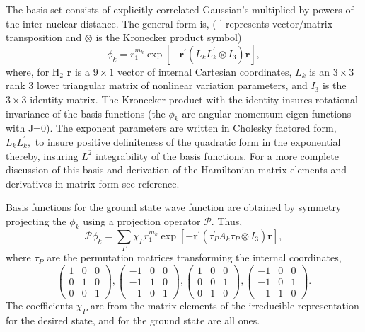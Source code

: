 The basis set consists of explicitly correlated Gaussian's multiplied by
powers of the inter-nuclear distance. 
The general form is, ( $^{\prime }$ represents vector/matrix transposition
and $\otimes $ is the Kronecker product symbol) 
\begin{equation} \label{basis}
 \phi _k =
  r_{1}^{m_k} \exp \left[ -\mathbf{r}^{\prime }
      \left( L_kL_k^{\prime }\otimes I_3\right)\mathbf{r}\right],
\end{equation}
where, for H$_2$ $ \mathbf{r}$ is a $9\times 1$ vector of internal 
Cartesian coordinates, $L_k$ is
an $3\times 3$ rank $3$ lower triangular matrix of nonlinear variation
parameters, and $I_3$ is the $3\times 3$ identity matrix. The Kronecker
product with the identity insures rotational invariance of the basis
functions (the $\phi _k$ are angular momentum eigen-functions with J=0). The
exponent parameters are written in Cholesky factored form, 
$L_kL_k^{\prime },$ 
to insure positive definiteness of the quadratic form in the exponential
thereby, insuring $L^2$ integrability of the basis functions.
For a more complete discussion of
this basis and derivation of the Hamiltonian matrix elements and derivatives
in matrix form see reference\cite{Kinghorn99a}.

Basis functions for the ground state wave function 
are obtained by symmetry
projecting the $\phi _k$ using a  projection operator
$\mathcal{P}$. Thus,
\begin{equation}
{\mathcal{P}} \phi_{k} = \sum_{P} \chi_{P} r_{1}^{m_{k}} 
   \exp \left[-\mathbf{r}^{\prime} \left( \tau_{P}^{\prime} A_{k} \tau_{P}
                                 \otimes I_{3} \right) \mathbf{r} \right],
\end{equation}
where $\tau_{P} $ are the permutation matrices transforming the
internal coordinates, 
\begin{equation}
\left( 
\begin{array}{ccc}
1 & 0 & 0 \\ 
0 & 1 & 0 \\
0 & 0 & 1
\end{array} 
\right),
\left( 
\begin{array}{ccc}
-1 & 0 & 0 \\ 
-1 & 1 & 0 \\
-1 & 0 & 1
\end{array} 
\right),
\left( 
\begin{array}{ccc}
1 & 0 & 0 \\ 
0 & 0 & 1 \\
0 & 1 & 0
\end{array} 
\right),
\left( 
\begin{array}{ccc}
-1 & 0 & 0 \\ 
-1 & 0 & 1 \\
-1 & 1 & 0
\end{array} 
\right).
\end{equation}
The coefficients $\chi_{P}$ are from the matrix elements of the irreducible
representation for the desired state, and for the ground state are all ones.

